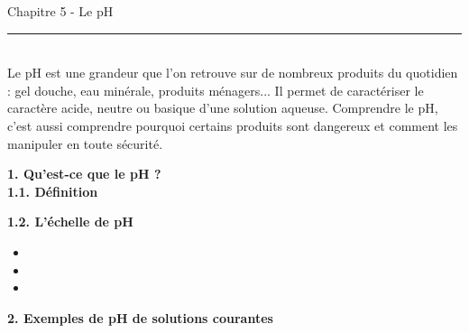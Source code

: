 \documentclass[11pt,a4paper]{article}
\newcommand{\trou}{\dotfill}
\begin{document}
\begin{center}
 \LARGE{Chapitre 5 - Le pH}
\end{center}

\normalsize

\hrule\
\\[0,2cm]

Le pH est une grandeur que l'on retrouve sur de nombreux produits du quotidien : gel douche, eau minérale, produits ménagers... Il permet de caractériser le caractère acide, neutre ou basique d'une solution aqueuse. Comprendre le pH, c'est aussi comprendre pourquoi certains produits sont dangereux et comment les manipuler en toute sécurité.

\vspace{3mm}

\textbf{1. Qu'est-ce que le pH ?} \\

\textbf{1.1. Définition}

\begin{tcolorbox}[colback=red!5!white,colframe=red!75!black]
{
\vspace{3cm}
}
\end{tcolorbox}


\textbf{1.2. L'échelle de pH}

\begin{center}
\end{center}

\begin{itemize}
    \item \trou
    \item \trou
    \item \trou
\end{itemize}

\textbf{2. Exemples de pH de solutions courantes} \\
\end{document}
